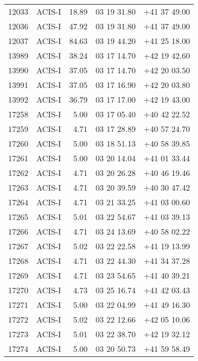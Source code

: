 \begin{longtable}{rlrll}
  12033 &     ACIS-I &          18.89 & 03 19 31.80 & +41 37 49.00 \\
  12036 &     ACIS-I &          47.92 & 03 19 31.80 & +41 37 49.00 \\
  12037 &     ACIS-I &          84.63 & 03 19 44.20 & +41 25 18.00 \\
  13989 &     ACIS-I &          38.24 & 03 17 14.70 & +42 19 42.60 \\
  13990 &     ACIS-I &          37.05 & 03 17 14.70 & +42 20 03.50 \\
  13991 &     ACIS-I &          37.05 & 03 17 16.90 & +42 20 03.80 \\
  13992 &     ACIS-I &          36.79 & 03 17 17.00 & +42 19 43.00 \\
  17258 &     ACIS-I &           5.00 & 03 17 05.40 & +40 42 22.52 \\
  17259 &     ACIS-I &           4.71 & 03 17 28.89 & +40 57 24.70 \\
  17260 &     ACIS-I &           5.00 & 03 18 51.13 & +40 58 39.85 \\
  17261 &     ACIS-I &           5.00 & 03 20 14.04 & +41 01 33.44 \\
  17262 &     ACIS-I &           4.71 & 03 20 26.28 & +40 46 19.46 \\
  17263 &     ACIS-I &           4.71 & 03 20 39.59 & +40 30 47.42 \\
  17264 &     ACIS-I &           4.71 & 03 21 33.25 & +41 03 00.60 \\
  17265 &     ACIS-I &           5.01 & 03 22 54.67 & +41 03 39.13 \\
  17266 &     ACIS-I &           4.71 & 03 24 13.69 & +40 58 02.22 \\
  17267 &     ACIS-I &           5.02 & 03 22 22.58 & +41 19 13.99 \\
  17268 &     ACIS-I &           4.71 & 03 22 44.30 & +41 34 37.28 \\
  17269 &     ACIS-I &           4.71 & 03 23 54.65 & +41 40 39.21 \\
  17270 &     ACIS-I &           4.73 & 03 25 16.74 & +41 42 03.43 \\
  17271 &     ACIS-I &           5.00 & 03 22 04.99 & +41 49 16.30 \\
  17272 &     ACIS-I &           5.02 & 03 22 12.66 & +42 05 10.06 \\
  17273 &     ACIS-I &           5.01 & 03 22 38.70 & +42 19 32.12 \\
  17274 &     ACIS-I &           5.00 & 03 20 50.73 & +41 59 58.49 \\

\end{longtable}
